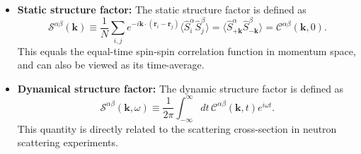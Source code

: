 \documentclass[aps, prx, nofootinbib, superscriptaddress]{revtex4-2}
\newcommand{\Tr}{\mathrm{Tr}}
\begin{document}
\begin{itemize}
\begin{itemize}
        \begin{equation}
            \langle (S_{-\mathbf{k}}^{\beta} ( 0 ))^{\dagger} (S_{\mathbf{k}}^{\alpha} ( t ))^{\dagger} \rangle
            = 
            \begin{cases}
                \langle S_{\mathbf{k}}^{\bar{\beta}} (0) S_{-\mathbf{k}}^{\bar{\alpha}} (t) \rangle
                = \langle S_{\mathbf{k}}^{\bar{\beta}} (-t) S_{-\mathbf{k}}^{\bar{\alpha}} (0) \rangle
                = \mathcal{C}^{\bar{\beta}\bar{\alpha}}(-\mathbf{k}, -t), 
                & \text{if } \alpha,\beta = \pm, 0, \\[1em]
                \langle S_{\mathbf{k}}^{\beta} (0) S_{-\mathbf{k}}^{\alpha} (t) \rangle
                = \langle S_{\mathbf{k}}^{\beta} (-t) S_{-\mathbf{k}}^{\alpha} (0) \rangle 
                = \mathcal{C}^{\beta\alpha}(-\mathbf{k}, -t), 
                & \text{if } \alpha, \beta = x, y, z.
            \end{cases}
        \end{equation}
        where in the second equality we use the identity $\langle \hat{A}(0) \hat{B}(t) \rangle = \langle \hat{A}(-t) \hat{B}(0) \rangle$ for thermal states $\rho = e^{-\beta H}/Z$:
        \begin{equation}
            \langle \hat{A}(0) \hat{B}(t) \rangle
            = \Tr[\rho \hat{A} \hat{U}^{\dagger}_{t} \hat{B} \hat{U}_{t}] 
            = \Tr[\rho \hat{U}_{t} \hat{A} \hat{U}^{\dagger}_{t} \hat{B}(0)]  
            = \langle \hat{A}(-t) \hat{B}(0) \rangle.
        \end{equation}
    \end{itemize}
    
    \item \textbf{Static structure factor:}
    The static structure factor is defined as
    \begin{equation}
        \mathcal{S}^{\alpha\beta}(\mathbf{k}) 
        \equiv
        \frac{1}{N} \sum_{i,j} e^{-i \mathbf{k} \cdot (\mathbf{r}_{i} - \mathbf{r}_{j})} 
        \big\langle \hat{S}^{\alpha}_{i} \hat{S}^{\beta}_{j} \big\rangle
        = \big\langle \hat{S}_{+ \mathbf{k}}^{\alpha} \hat{S}_{- \mathbf{k}}^{\beta} \big\rangle 
        = \mathcal{C}^{\alpha\beta}(\mathbf{k}, 0).
    \end{equation}
    This equals the equal-time spin-spin correlation function in momentum space, and can also be viewed as its time-average.

    
    \item \textbf{Dynamical structure factor:}
    The dynamic structure factor is defined as 
    \begin{equation}
        \mathcal{S}^{\alpha\beta}(\mathbf{k}, \omega) 
        \equiv \frac{1}{2\pi} \int_{-\infty}^{\infty} dt \, \mathcal{C}^{\alpha\beta}(\mathbf{k}, t) e^{i \omega t}.
    \end{equation}
    This quantity is directly related to the scattering cross-section in neutron scattering experiments.



\end{itemize}
\end{document}
